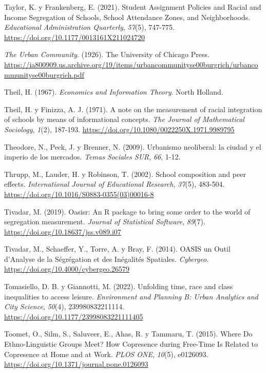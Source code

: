 \documentclass[
  spanish,
  a4paper,%
  chapterprefix=true,%
  DIV=calc,%
  twoside]{scrbook}%
\newlength{\cslhangindent}
\newenvironment{CSLReferences}[2] %
 {\begin{list}{}{%
  \setlength{\itemindent}{0pt}
  \setlength{\leftmargin}{0pt}
  \setlength{\parsep}{0pt}
  \ifodd #1
   \setlength{\leftmargin}{\cslhangindent}
   \setlength{\itemindent}{-1\cslhangindent}
  \fi
  \setlength{\itemsep}{#2\baselineskip}}}
 {\end{list}}
\begin{document}
\begin{CSLReferences}{1}{0}
Taylor, K. y Frankenberg, E. (2021). Student Assignment Policies and Racial and Income Segregation of Schools, School Attendance Zones, and Neighborhoods. \emph{Educational Administration Quarterly}, \emph{57}(5), 747-775. \url{https://doi.org/10.1177/0013161X211024720}

\emph{The Urban Community}. (1926). The University of Chicago Press. \url{https://ia800909.us.archive.org/19/items/urbancommunityse00burgrich/urbancommunityse00burgrich.pdf}

Theil, H. (1967). \emph{Economics and Information Theory}. North Holland.

Theil, H. y Finizza, A. J. (1971). A note on the measurement of racial integration of schools by means of informational concepts. \emph{The Journal of Mathematical Sociology}, \emph{1}(2), 187-193. \url{https://doi.org/10.1080/0022250X.1971.9989795}

Theodore, N., Peck, J. y Brenner, N. (2009). Urbanismo neoliberal: la ciudad y el imperio de los mercados. \emph{Temas Sociales SUR}, \emph{66}, 1-12.

Thrupp, M., Lauder, H. y Robinson, T. (2002). School composition and peer effects. \emph{International Journal of Educational Research}, \emph{37}(5), 483-504. \url{https://doi.org/10.1016/S0883-0355(03)00016-8}

Tivadar, M. (2019). Oasisr: An R package to bring some order to the world of segregation measurement. \emph{Journal of Statistical Software}, \emph{89}(7). \url{https://doi.org/10.18637/jss.v089.i07}

Tivadar, M., Schaeffer, Y., Torre, A. y Bray, F. (2014). OASIS {\textendash} un Outil d{'}Analyse de la Ségrégation et des Inégalités Spatiales. \emph{Cybergeo}. \url{https://doi.org/10.4000/cybergeo.26579}

Tomasiello, D. B. y Giannotti, M. (2022). Unfolding time, race and class inequalities to access leisure. \emph{Environment and Planning B: Urban Analytics and City Science}, \emph{50}(4), 239980832211114. \url{https://doi.org/10.1177/23998083221111405}

Toomet, O., Silm, S., Saluveer, E., Ahas, R. y Tammaru, T. (2015). Where Do Ethno-Linguistic Groups Meet? How Copresence during Free-Time Is Related to Copresence at Home and at Work. \emph{PLOS ONE}, \emph{10}(5), e0126093. \url{https://doi.org/10.1371/journal.pone.0126093}


\end{CSLReferences}
\end{document}
